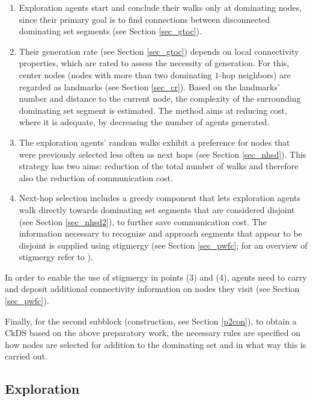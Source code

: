 \begin{enumerate}

		\item Exploration agents start and conclude their walks only at dominating nodes, since their primary goal is to find connections between disconnected dominating set segments (see Section \ref{sec_gtoc}).

		\item Their generation rate (see Section \ref{sec_gtoc}) depends on local connectivity properties, which are rated to assess the necessity of generation. For this, center nodes (nodes with more than two dominating $1$-hop neighbors) are regarded as landmarks (see Section \ref{sec_cr}). Based on the landmarks' number and distance to the current node, the complexity of the surrounding dominating set segment is estimated. The method aims at reducing cost, where it is adequate, by decreasing the number of agents generated. 

		\item The exploration agents' random walks exhibit a preference for nodes that were previously selected less often as next hops (see Section \ref{sec_nhsd}). This strategy has two aims: reduction of the total number of walks and therefore also the reduction of communication cost.

		\item Next-hop selection includes a greedy component that lets exploration agents walk directly towards dominating set segments that are considered disjoint (see Section \ref{sec_nhsd2}), to further save communication cost. The information necessary to recognize and approach segments that appear to be disjoint is supplied using stigmergy (see Section \ref{sec_pwfc}; for an overview of stigmergy refer to \cite{theraulazB99history}).
	
\end{enumerate}


In order to enable the use of stigmergy in points (3) and (4), agents need to carry and deposit additional connectivity information on nodes they visit (see Section \ref{sec_pwfc}). 

Finally, for the second subblock (construction, see Section \ref{p2con}), to obtain a CkDS based on the above preparatory work, the necessary rules are specified on how nodes are selected for addition to the dominating set and in what way this is carried out.


\subsection{Exploration}\label{p2ex}

